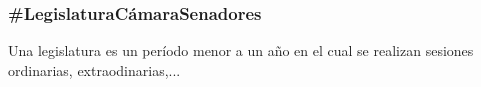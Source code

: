 \subsubsection{\#LegislaturaCámaraSenadores}

Una legislatura es un período menor a un año en el cual se realizan
sesiones ordinarias, extraodinarias,...

\begin{description}
  
\end{description}